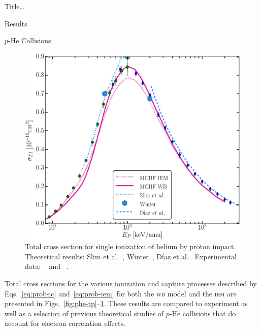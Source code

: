 \documentclass[letterpaper, 10 pt]{report}
\begin{document}
\begin{chapter}{ Title\dots \label{chap:p-he2p-he}}
\begin{section}{Results \label{sec:phe2p-res}}
\begin{subsection}{\texorpdfstring{$p$}{p}-He Collisions \label{sec:phe-res}}
\begin{figure}[ht]
\begin{minipage}{.49\linewidth}
               \centering
               \includegraphics[width = \linewidth]{./images/phe/phe-TI.eps}
               \caption[Total cross section for single ionization of helium by proton impact.]
                       {Total cross section for single ionization of helium by proton impact.
                        Theoretical results: Slim et al.~\cite{SHBF-91},
                        Winter~\cite{Winter-91}, D\'{i}az et al.~\cite{DMS-00}
                        Experimental data: {\color{OliveGreen}{$\bullet$}}~\cite{SG89} and
                        {\color{blue}{$\blacklozenge$}}~\cite{SG85}. \label{fig:phe-ti}}
            \end{minipage}
         \end{figure}

         Total cross sections for the various ionization and capture processes described by
         Eqs.~\eqref{eq:prob-ic} and~\eqref{eq:prob-iem} for both the \textsc{wb} model and the
         \textsc{iem} are presented in Figs.~\ref{fig:phe-tp}--\ref{fig:phe-ti}. These results are
         compared to experiment as well as a selection of previous theoretical studies of $p$-He
         collisions that do account for electron correlation effects.


\end{subsection}
\end{section}
\end{chapter}
\end{document}
